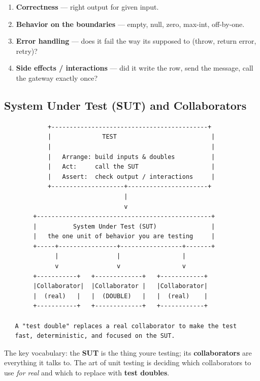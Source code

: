 \documentclass[11pt]{article}
\providecommand{\tightlist}{\setlength{\itemsep}{1pt}\setlength{\parskip}{0pt}}
\begin{document}
\begin{enumerate}
\def\labelenumi{\arabic{enumi}.}
\tightlist
\item
  \textbf{Correctness} --- right output for given input.
\item
  \textbf{Behavior on the boundaries} --- empty, null, zero, max-int, off-by-one.
\item
  \textbf{Error handling} --- does it fail the way it\textquotesingle s supposed to (throw, return error, retry)?
\item
  \textbf{Side effects / interactions} --- did it write the row, send the message, call the gateway exactly once?
\end{enumerate}

\subsection{System Under Test (SUT) and Collaborators}\label{system-under-test-sut-and-collaborators}

\setcodelang{}

\begin{verbatim}
            +-------------------------------------------+
            |              TEST                          |
            |                                            |
            |   Arrange: build inputs & doubles          |
            |   Act:     call the SUT                    |
            |   Assert:  check output / interactions     |
            +--------------------+----------------------+
                                 |
                                 v
        +------------------------------------------------+
        |          System Under Test (SUT)               |
        |   the one unit of behavior you are testing     |
        +-----+----------------+-----------------+-------+
              |                |                 |
              v                v                 v
        +-----------+   +-------------+   +------------+
        |Collaborator|  |Collaborator |   |Collaborator|
        |  (real)   |   |  (DOUBLE)   |   |  (real)    |
        +-----------+   +-------------+   +------------+

   A "test double" replaces a real collaborator to make the test
   fast, deterministic, and focused on the SUT.
\end{verbatim}

The key vocabulary: the \textbf{SUT} is the thing you\textquotesingle re testing; its \textbf{collaborators} are everything it talks to. The art of unit testing is deciding which collaborators to use \emph{for real} and which to replace with \textbf{test doubles}.
\end{document}

